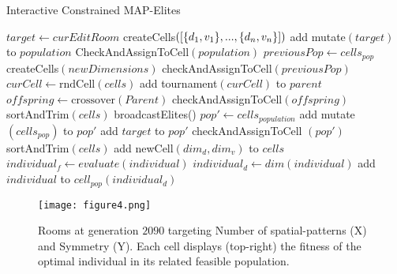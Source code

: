 \begin{algorithm}
\caption{Interactive Constrained MAP-Elites}\label{alg:IC-MAPE}
\begin{algorithmic}[1]
\State $target \gets curEditRoom$ 
\State createCells$(\protect[\{d_1,v_1\},...,\{d_n,v_n\}])$
     \State add mutate$(target)$ to $population$
\EndFor
\State CheckAndAssignToCell$(population)$ 
 
            \State $previousPop \gets cells_{pop}$
            \State createCells$(newDimensions)$
            \State checkAndAssignToCell$(previousPop)$ 
        \EndIf
                \State $curCell \gets \text{rndCell}(cells)$
                \State add tournament$(curCell)$ to $parent$
            \EndFor
            \State $offspring \gets  \text{crossover}(Parent)$
            \State checkAndAssignToCell$(offspring)$
        \EndRepeat
        \State sortAndTrim$(cells)$
    \EndFor
    \State broadcastElites() 
    \State $pop' \gets cells_{population}$
    \State add mutate$(cells_{pop})$ to $pop'$
    \State add $target$ to $pop'$
    \State checkAndAssignToCell $(pop')$
    \State sortAndTrim$(cells)$
\EndWhile
\EndProcedure
{}
        \State add newCell$(dim_d, dim_v)$ to $cells$
    \EndFor
\EndProcedure
{}
        \State $individual_f \gets evaluate(individual)$ 
        \State $individual_d \gets dim(individual)$
        \State add $individual$ to $cell_{pop}(individual_d)$
    \EndFor
\EndProcedure
\end{algorithmic}
\end{algorithm}

\begin{figure*}[t]
\centerline{\texttt{[image: figure4.png]}}
\caption{Rooms at generation $2090$ targeting Number of spatial-patterns (X) and Symmetry (Y). Each cell displays (top-right) the fitness of the optimal individual in its related feasible population. }
\label{figs:patt_sym}
\end{figure*}

